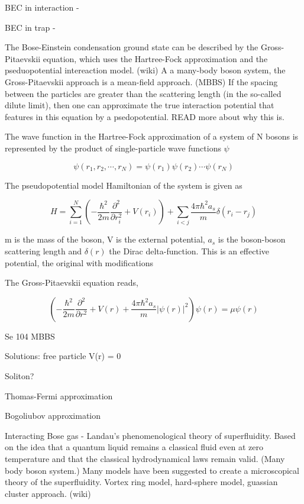 BEC in interaction - 

BEC in trap - 

The Bose-Einstein condensation ground state can be described by the Gross-Pitaevskii equation, which uses the Hartree-Fock approximation and the pseduopotential intereaction model. (wiki) 
A a many-body boson system, the Gross-Pitaevskii approach is a mean-field approach. (MBBS)
If the spacing between the particles are greater than the scattering length (in the so-called dilute limit), then one can approximate the true interaction potential that features in this equation by a psedopotential. READ more about why this is.

The wave function in the Hartree-Fock approximation of a system of N bosons is represented by the product of single-particle wave functions $\psi$

\begin{equation}
\psi(r_1, r_2, \cdots, r_N) = \psi(r_1) \psi(r_2) \cdots \psi(r_N)
\end{equation}

The pseudopotential model Hamiltonian of the system is given as 

\begin{equation}
H = \sum_{i=1}^N \left( -\frac{\hbar^2}{2m} \frac{\partial^2}{\partial r_i^2} + V(r_i) \right) + \sum_{i<j} \frac{4 \pi \hbar^2 a_s}{m} \delta (r_i - r_j)
\end{equation}

m is the mass of the boson, V is the external potential, $a_s$ is the boson-boson scattering length and $\delta(r)$ the Dirac delta-function. This is an effective potential, the original  with modifications 

The Gross-Pitaevskii equation reads, 

\begin{equation}
\left( -\frac{\hbar^2}{2m} \frac{\partial^2}{\partial r^2} + V(r) + \frac{4 \pi \hbar^2 a_s}{m}|\psi(r)|^2 \right) \psi(r) = \mu \psi (r)
\end{equation}

Se 104 MBBS

Solutions: free particle V(r) = 0

Soliton?

Thomas-Fermi approximation

Bogoliubov approximation

Interacting Bose gas - Landau's phenomenological theory of superfluidity. Based on the idea that a quantum liquid remains a classical fluid even at zero temperature  and that the classical hydrodynamical laws remain valid. (Many body boson system.) 
Many models have been suggested to create a microscopical theory of the superfluidity. Vortex ring model, hard-sphere model, guassian cluster approach. (wiki)

